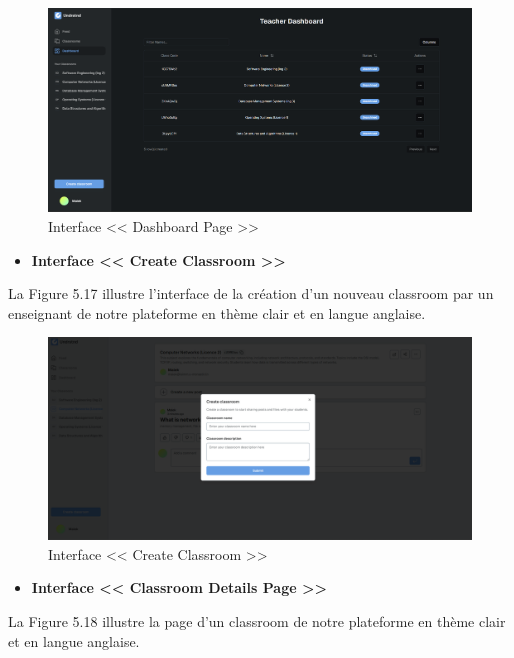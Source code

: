 \begin{figure}[H]
    \centering
    \includegraphics[width=1.1\textwidth,height=0.5\textwidth]{images/chp5/fig16.png}
    \caption{Interface << Dashboard Page >>}
    \label{Interface << Dashboard Page >>}    
\end{figure}
\begin{itemize}
    \item \textbf{Interface << Create Classroom >>}
\end{itemize}
La Figure 5.17 illustre l'interface de la création d'un nouveau classroom  par un enseignant de notre plateforme en thème clair et en langue anglaise.
\begin{figure}[H]
    \centering
    \includegraphics[width=1.1\textwidth,height=0.5\textwidth]{images/chp5/fig17.png}
    \caption{Interface << Create Classroom >>}
    \label{Interface << Create Classroom >>}    
\end{figure}
\begin{itemize}
    \item \textbf{Interface << Classroom Details Page >>}
\end{itemize}
La Figure 5.18 illustre la page d'un classroom de notre plateforme en thème clair et en langue anglaise.
